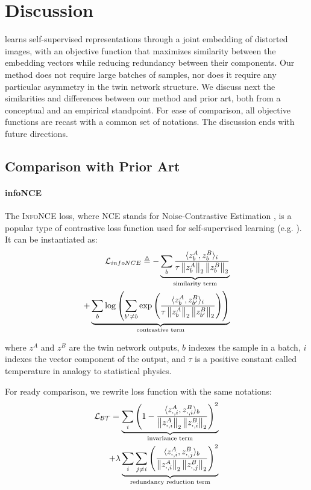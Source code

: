 \section{Discussion}

\AlgoName{} learns self-supervised representations through a joint embedding of distorted images, with an objective function that maximizes similarity between the embedding vectors while reducing redundancy between their components. Our method does not require large batches of samples, nor does it require any particular asymmetry in the twin network structure. We discuss next the similarities and differences between our method and prior art, both from a conceptual and an empirical standpoint. For ease of comparison, all objective functions are recast with a common set of notations. The discussion ends with future directions.

\subsection{Comparison with Prior Art}

\paragraph{infoNCE}

The \textsc{InfoNCE} loss, where NCE stands for Noise-Contrastive Estimation \cite{gutmann_noise-contrastive_2010}, is a popular type of contrastive loss function used for self-supervised learning (e.g. \cite{oord2018representation, chen2020simple, he2019momentum,henaff2019data}). It can be instantiated as:
\begin{align*}
\mathcal{L}_{infoNCE} \triangleq - \underbrace{\sum_b \frac{\langle z^A_{b}, 
z^B_{b} \rangle_i}{\tau\left\lVert z^A_{b}\right\rVert_2\left\lVert z^B_{b}\right\rVert_2}}_\text{similarity term}\\
+ \underbrace{\sum_{b} \log\left( \sum_{b' \neq b} \exp \left(\frac{\langle z^A_{b}, 
z^B_{b'} \rangle_i}{\tau\left\lVert z^A_{b}\right\rVert_2\left\lVert z^B_{b'}\right\rVert_2}\right)\right)}_\text{contrastive term}
\end{align*}

where $z^A$ and $z^B$ are the twin network outputs, $b$ indexes the sample in a batch, $i$ indexes the vector component of the output, and $\tau$ is a positive constant called temperature in analogy to statistical physics.

For ready comparison, we rewrite \AlgoName{} loss function with the same notations:
\begin{align*}
\mathcal{L_{BT}} =  \underbrace{\sum_i \left(1-\frac{\langle z^A_{\boldsymbol{\cdot},i}, 
z^B_{\boldsymbol{\cdot},i} \rangle_b}{\left\lVert z^A_{\boldsymbol{\cdot},i}  \right\rVert_2 \left\lVert z^B_{\boldsymbol{\cdot},i}\right\rVert_2}\right) ^2}_\text{invariance term} \\
+ \lambda \underbrace{\sum_{i} \sum_{j \neq i} \left(\frac{\langle z^A_{\boldsymbol{\cdot},i}, 
z^B_{\boldsymbol{\cdot},j} \rangle_b}{\left\lVert z^A_{\boldsymbol{\cdot},i} \right\rVert_2\left\lVert z^B_{\boldsymbol{\cdot},j}\right\rVert_2}\right)^2}_\text{redundancy reduction term}
\end{align*}

